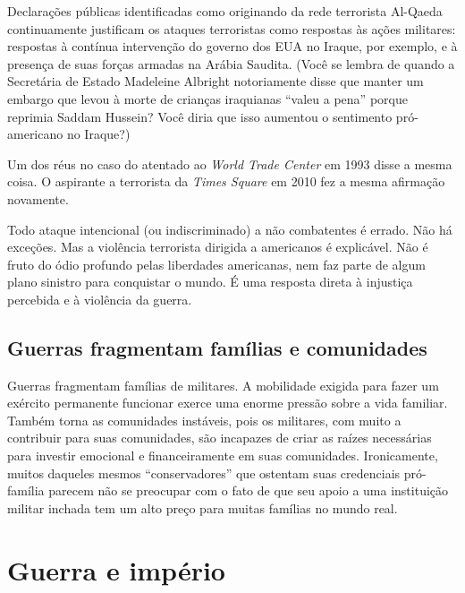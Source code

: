 Declarações públicas identificadas como originando da rede terrorista Al-Qaeda continuamente justificam os ataques terroristas como respostas às ações militares: respostas à contínua intervenção do governo dos EUA no Iraque, por exemplo, e à presença de suas forças armadas na Arábia Saudita. (Você se lembra de quando a Secretária de Estado Madeleine Albright notoriamente disse que manter um embargo que levou à morte de crianças iraquianas ``valeu a pena'' porque reprimia Saddam Hussein? Você diria que isso aumentou o sentimento pró-americano no Iraque?)

Um dos réus no caso do atentado ao \emph{World Trade Center} em 1993 disse a mesma coisa. O aspirante a terrorista da \emph{Times Square} em 2010 fez a mesma afirmação novamente.

Todo ataque intencional (ou indiscriminado) a não combatentes é errado. Não há exceções. Mas a violência terrorista dirigida a americanos é explicável. Não é fruto do ódio profundo pelas liberdades americanas, nem faz parte de algum plano sinistro para conquistar o mundo. É uma resposta direta à injustiça percebida e à violência da guerra.

\subsection*{Guerras fragmentam famílias e comunidades}

Guerras fragmentam famílias de militares. A mobilidade exigida para fazer um exército permanente funcionar exerce uma enorme pressão sobre a vida familiar. Também torna as comunidades instáveis, pois os militares, com muito a contribuir para suas comunidades, são incapazes de criar as raízes necessárias para investir emocional e financeiramente em suas comunidades. Ironicamente, muitos daqueles mesmos ``conservadores'' que ostentam suas credenciais pró-família parecem não se preocupar com o fato de que seu apoio a uma instituição militar inchada tem um alto preço para muitas famílias no mundo real.

\section{Guerra e império}

